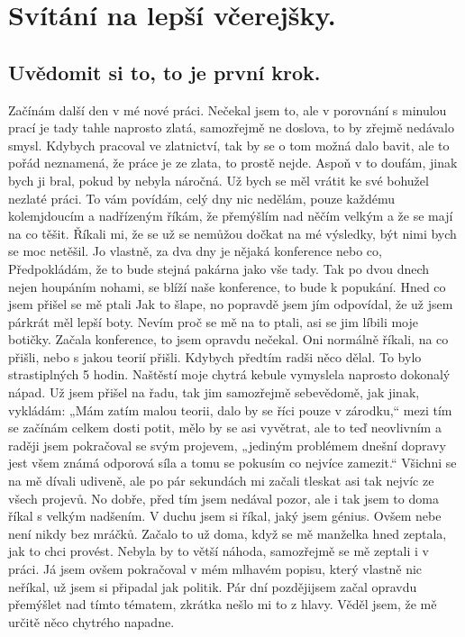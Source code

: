 \chapter{Svítání na lepší včerejšky.}

\section{Uvědomit si to, to je první krok.}

Začínám další den v mé nové práci. Nečekal jsem to, ale v porovnání s minulou prací je tady tahle naprosto zlatá, samozřejmě ne doslova, to by zřejmě nedávalo smysl. Kdybych pracoval ve zlatnictví, tak by se o tom možná dalo bavit, ale to pořád neznamená, že práce je ze zlata, to prostě nejde. Aspoň v to doufám, jinak bych ji bral, pokud by nebyla náročná. Už bych se měl vrátit ke své bohužel nezlaté práci. To vám povídám, celý dny nic nedělám, pouze každému kolemjdoucím a nadřízeným říkám, že přemýšlím nad něčím velkým a že se mají na co těšit. Říkali mi, že se už se nemůžou dočkat na mé výsledky, být nimi bych se moc netěšil. Jo vlastně, za dva dny je nějaká konference nebo co, Předpokládám, že to bude stejná pakárna jako vše tady. Tak po dvou dnech nejen houpáním nohami, se blíží naše konference, to bude k popukání. Hned co jsem přišel se mě ptali Jak to šlape, no popravdě jsem jím odpovídal, že už jsem párkrát měl lepší boty. Nevím proč se mě na to ptali, asi se jim líbili moje botičky. Začala konference, to jsem opravdu nečekal. Oni normálně říkali, na co přišli, nebo s jakou teorií přišli. Kdybych předtím radši něco dělal. To bylo strastiplných 5 hodin. Naštěstí moje chytrá kebule vymyslela naprosto dokonalý nápad. Už jsem přišel na řadu, tak jim samozřejmě sebevědomě, jak jinak, vykládám: „Mám zatím malou teorii, dalo by se říci pouze v zárodku,“ mezi tím se začínám celkem dosti potit, mělo by se asi vyvětrat, ale to teď neovlivním a raději jsem pokračoval se svým projevem, „jediným problémem dnešní dopravy jest všem známá odporová síla a tomu se pokusím co nejvíce zamezit.“ Všichni se na mě dívali udiveně, ale po pár sekundách mi začali tleskat asi tak nejvíc ze všech projevů. No dobře, před tím jsem nedával pozor, ale i tak jsem to doma říkal s velkým nadšením. V duchu jsem si říkal, jaký jsem génius. Ovšem nebe není nikdy bez mráčků. Začalo to už doma, když se mě manželka hned zeptala, jak to chci provést. Nebyla by to větší náhoda, samozřejmě se mě zeptali i v práci. Já jsem ovšem pokračoval v mém mlhavém popisu, který vlastně nic neříkal, už jsem si připadal jak politik. Pár dní pozdějijsem začal opravdu přemýšlet nad tímto tématem, zkrátka nešlo mi to z hlavy. Věděl jsem, že mě určitě něco chytrého napadne.

